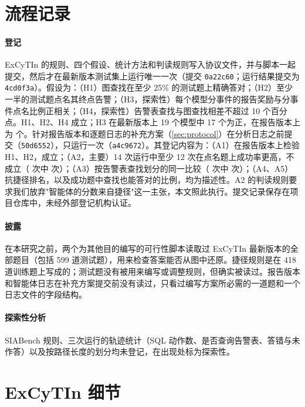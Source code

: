 \section{流程记录}
\label{app:protocol}

\paragraph{登记} ExCyTIn 的规则、四个假设、统计方法和判读规则写入协议文件，并与脚本一起提交，然后才在最新版本测试集上运行唯一一次（提交 \texttt{0a22c60}；运行结果提交为 \texttt{4cd0f3a}）。假设为：（H1）图查找在至少 25\% 的测试题上精确答对；（H2）至少一半的测试题点名其终点告警；（H3，探索性）每个模型分事件的报告奖励与分事件点名比例正相关；（H4，探索性）告警表查找与图查找相差不超过 10 个百分点。H1、H2、H4 成立；H3 在最新版本上 19 个模型中 17 个为正，在报告版本上为 \oHPos{} 个。针对报告版本和逐题日志的补充方案（\cref{sec:protocol}）在分析日志之前提交（\texttt{50d6552}），只运行一次（\texttt{a4c9672}）。其登记内容为：（A1）在报告版本上检验 H1、H2，成立；（A2，主要）14 次运行中至少 12 次在点名题上成功率更高，不成立（\lgModels{} 次中 \lgPos{} 次）；（A3）按告警表查找划分的同一比较（\lgModels{} 次中 \lgTPos{} 次）；（A4、A5）抗捷径排名，以及成功题中查找也能答对的比例，均为描述性。A2 的判读规则要求我们放弃"智能体的分数来自捷径"这一主张，本文照此执行。提交记录保存在项目仓库中，未经外部登记机构认证。

\paragraph{披露} 在本研究之前，两个为其他目的编写的可行性脚本读取过 ExCyTIn 最新版本的全部题目（包括 599 道测试题），用来检查答案能否从图中还原。捷径规则是在 418 道训练题上写成的；测试题没有被用来编写或调整规则，但确实被读过。报告版本和智能体日志在补充方案提交前没有读过，只看过编写方案所必需的一道题和一个日志文件的字段结构。

\paragraph{探索性分析} SIABench 规则、三次运行的轨迹统计（SQL 动作数、是否查询告警表、答错与未作答）以及按路径长度的划分均未登记，在出现处标为探索性。

\section{ExCyTIn 细节}
\label{app:excytin}

